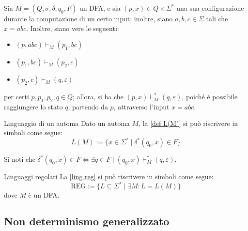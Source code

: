 \documentclass[a4paper, 12pt]{report}
\begin{document}
    \begin{example}
        Sia $M = (Q, \sigma, \delta, q_0, F)$ un DFA, e sia $(p, x) \in Q \times \Sigma ^*$ una sua configurazione durante la computazione di un certo input; inoltre, siano $a, b, c \in \Sigma$ tali che $x = abc$. Inoltre, siano vere le seguenti:

        \begin{itemize}
            \item $(p, abc) \vdash_M (p_1, bc)$
            \item $(p_1, bc) \vdash_M (p_2, c)$
            \item $(p_2, c) \vdash_M (q, \varepsilon)$
        \end{itemize}

        per certi $p, p_1, p_2, q \in Q$; allora, si ha che $(p, x) \vdash_M^* (q, \varepsilon)$, poiché è possibile raggiungere lo stato $q$, partendo da $p$, attraverso l'input $x = abc$.
    \end{example}

    \begin{framedobs}{Linguaggio di un automa}
        Dato un automa $M$, la \cref{def L(M)} si può riscrivere in simboli come segue: $$L(M) := \{x \in \Sigma ^* \mid \delta^*(q_0, x) \in F\}$$

        Si noti che $\delta^*(q_0, x) \in F \iff \exists q \in F \mid (q_0, x) \vdash_M^* (q, \varepsilon)$.
    \end{framedobs}

    \begin{framedobs}{Linguaggi regolari}
        La \cref{ling reg} si può riscrivere in simboli come segue: $$\mathrm{REG} := \{ L \subseteq \Sigma^* \mid \exists M : L = L(M) \}$$ dove $M$ è un DFA.
    \end{framedobs}


    \subsection{Non determinismo generalizzato}
    
\end{document}
